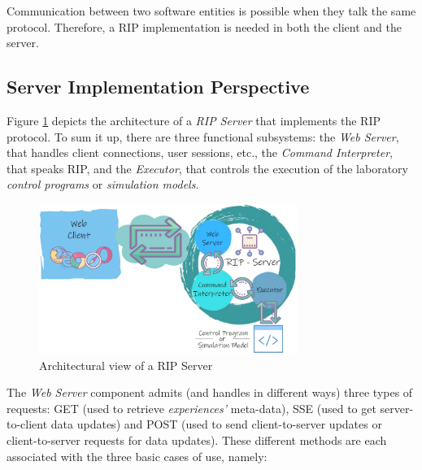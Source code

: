Communication between two software entities is possible when they talk the same protocol. Therefore, a RIP implementation is needed in both the client and the server.

\subsection{Server Implementation Perspective}
Figure \ref{fig:RIP_Architecture} depicts the architecture of a \emph{RIP Server} that implements the RIP protocol. To sum it up, there are three functional subsystems: the \emph{Web Server}, that handles client connections, user sessions, etc., the \emph{Command Interpreter}, that speaks RIP, and the \emph{Executor}, that controls the execution of the laboratory \textit{control programs} or \textit{simulation models}.

\begin{figure}[b!]
\centering
\includegraphics[width=0.75\textwidth]{images/RIPArchitecture.pdf}
\caption{Architectural view of a RIP Server}
\label{fig:RIP_Architecture}
\end{figure}

The \textit{Web Server} component admits (and handles in different ways) three types of requests: GET (used to retrieve \textit{experiences'} meta-data), SSE (used to get server-to-client data updates) and POST (used to send client-to-server updates or client-to-server requests for data updates). These different methods are each associated with the three basic cases of use, namely:

